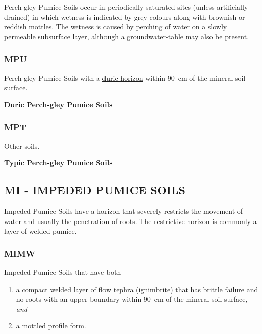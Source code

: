 \documentclass[
  letterpaper,
  DIV=11,
  numbers=noendperiod]{scrreprt}
\providecommand{\tightlist}{%
  \setlength{\itemsep}{0pt}\setlength{\parskip}{0pt}}\usepackage{longtable,booktabs,array}
\begin{document}
Perch-gley Pumice Soils occur in periodically saturated sites (unless
artificially drained) in which wetness is indicated by grey colours
along with brownish or reddish mottles. The wetness is caused by
perching of water on a slowly permeable subsurface layer, although a
groundwater-table may also be present.

\hypertarget{sec-key-MPU}{%
\subsubsection{\texorpdfstring{\textbf{MPU}}{MPU}}\label{sec-key-MPU}}

Perch-gley Pumice Soils with a \protect\hyperlink{sec-diag-dpan}{duric
horizon} within 90~cm of the mineral soil surface.

\textbf{Duric Perch-gley Pumice Soils}

\hypertarget{sec-key-MPT}{%
\subsubsection{\texorpdfstring{\textbf{MPT}}{MPT}}\label{sec-key-MPT}}

Other soils.

\textbf{Typic Perch-gley Pumice Soils}

\hypertarget{sec-MI}{%
\subsection{\texorpdfstring{\textbf{MI} - IMPEDED PUMICE
SOILS}{MI - IMPEDED PUMICE SOILS}}\label{sec-MI}}

Impeded Pumice Soils have a horizon that severely restricts the movement
of water and usually the penetration of roots. The restrictive horizon
is commonly a layer of welded pumice.

\hypertarget{sec-key-MIMW}{%
\subsubsection{\texorpdfstring{\textbf{MIMW}}{MIMW}}\label{sec-key-MIMW}}

Impeded Pumice Soils that have both

\begin{enumerate}
\def\labelenumi{\arabic{enumi}.}
\tightlist
\item
  a compact welded layer of flow tephra (ignimbrite) that has brittle
  failure and no roots with an upper boundary within 90~cm of the
  mineral soil surface, \emph{and}
\item
  a \protect\hyperlink{sec-diag-mottpf}{mottled profile form}.
\end{enumerate}
\end{document}
